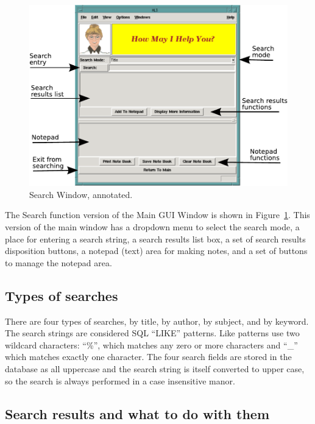 \begin{figure}[hpt]
\begin{centering}
\includegraphics[width=5in]{SearchWindowAnnotated.pdf}
\caption{Search Window, annotated.}
\label{fig:ref:searchwindowAnno}
\end{centering}
\end{figure}
The Search function version of the Main GUI Window is shown in
Figure~\ref{fig:ref:searchwindowAnno}. This version of the main window
has a dropdown menu to select the search mode, a place for entering a
search string, a search results list box, a set of search results
disposition buttons, a notepad (text) area for making notes, and a set
of buttons to manage the notepad area. 

\subsection{Types of searches}

There are four types of searches, by title, by author, by subject, and
by keyword. The search strings are considered SQL ``LIKE'' patterns. 
Like patterns use two wildcard characters: ``\%'', which matches any
zero or more characters and ``\_'' which matches exactly one character. 
The four search fields are stored in the database as all uppercase and
the search string is itself converted to upper case, so the search is
always performed in a case insensitive manor. 

\subsection{Search results and what to do with them}

